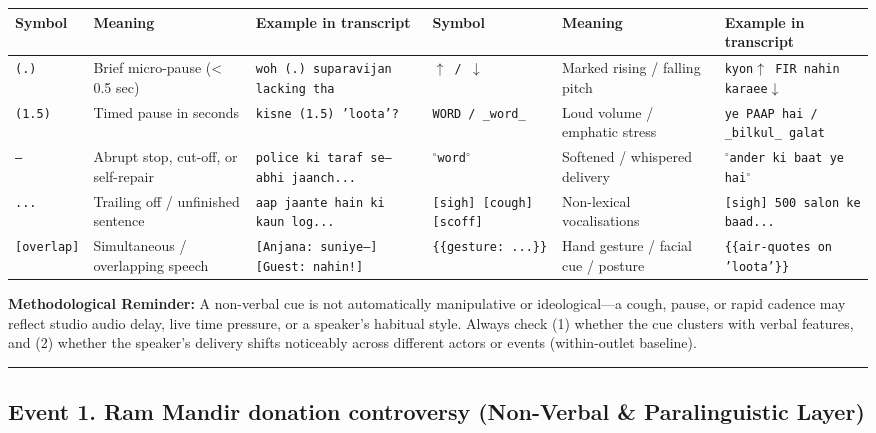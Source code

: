 \documentclass[10pt,a4paper]{article}
\begin{document}
\begin{longtable}{|p{}|p{}|p{}|p{}|p{}|p{}|}
\hline
Symbol & Meaning & Example in transcript & Symbol & Meaning & Example in transcript \\ \hline \endhead
\texttt{(.)} & Brief micro-pause (< 0.5 sec) & \texttt{woh (.) suparavijan lacking tha} & \texttt{$\uparrow$ / $\downarrow$} & Marked rising / falling pitch & \texttt{kyon$\uparrow$ FIR nahin karaee$\downarrow$} \\ \hline
\texttt{(1.5)} & Timed pause in seconds & \texttt{kisne (1.5) 'loota'?} & \texttt{WORD / \_word\_} & Loud volume / emphatic stress & \texttt{ye PAAP hai / \_bilkul\_ galat} \\ \hline
\texttt{---} & Abrupt stop, cut-off, or self-repair & \texttt{police ki taraf se--- abhi jaanch...} & \texttt{$^\circ$word$^\circ$} & Softened / whispered delivery & \texttt{$^\circ$ander ki baat ye hai$^\circ$} \\ \hline
\texttt{...} & Trailing off / unfinished sentence & \texttt{aap jaante hain ki kaun log...} & \texttt{[sigh] [cough] [scoff]} & Non-lexical vocalisations & \texttt{[sigh] 500 salon ke baad...} \\ \hline
\texttt{[overlap]} & Simultaneous / overlapping speech & \texttt{[Anjana: suniye---] [Guest: nahin!]} & \texttt{\{\{gesture: ...\}\}} & Hand gesture / facial cue / posture & \texttt{\{\{air-quotes on 'loota'\}\}} \\ \hline
\end{longtable}

\textbf{Methodological Reminder:} A non-verbal cue is not automatically manipulative or ideological---a cough, pause, or rapid cadence may reflect studio audio delay, live time pressure, or a speaker's habitual style. Always check (1) whether the cue clusters with verbal features, and (2) whether the speaker's delivery shifts noticeably across different actors or events (within-outlet baseline).\par\smallskip

\bigskip\hrule\bigskip

\subsection*{Event 1. Ram Mandir donation controversy (Non-Verbal \& Paralinguistic Layer)}
\end{document}
